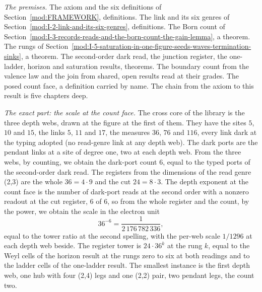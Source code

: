 \begin{chproof}
\textit{The premises.} The axiom and the six definitions of Section~\ref{mod:FRAMEWORK}, definitions. The link and its six genres of Section~\ref{mod:I-2-link-and-its-six-genres}, definitions. The Born count of Section~\ref{mod:I-3-records-reads-and-the-born-count-the-gain-lemma}, a theorem. The rungs of Section~\ref{mod:I-5-saturation-in-one-figure-seeds-waves-termination-sinks}, a theorem. The second-order dark read, the junction register, the one-ladder, horizon and saturation results, theorems. The boundary count from the valence law and the join from shared, open results read at their grades. The posed count face, a definition carried by name. The chain from the axiom to this result is five chapters deep.

\textit{The exact part: the scale at the count face.} The cross core of the library is the three depth webs, drawn at the figure at the first of them. They have the sites $5$, $10$ and $15$, the links $5$, $11$ and $17$, the measures $36$, $76$ and $116$, every link dark at the typing adopted (no read-genre link at any depth web). The dark ports are the pendant links at a site of degree one, two at each depth web. From the three webs, by counting, we obtain the dark-port count $6$, equal to the typed ports of the second-order dark read. The registers from the dimensions of the read genre (2,3) are the whole $36=4\cdot 9$ and the cut $24=8\cdot 3$. The depth exponent at the count face is the number of dark-port reads at the second order with a nonzero readout at the cut register, $6$ of $6$, so from the whole register and the count, by the power, we obtain the scale in the electron unit
\begin{equation}
36^{-6}=\frac{1}{2\,176\,782\,336},
\end{equation}
equal to the tower ratio at the second spelling, with the per-web scale $1/1296$ at each depth web beside. The register tower is $24\cdot 36^{k}$ at the rung $k$, equal to the Weyl cells of the horizon result at the rungs zero to six at both readings and to the ladder cells of the one-ladder result. The smallest instance is the first depth web, one hub with four (2,4) legs and one (2,2) pair, two pendant legs, the count two.


\end{chproof}
